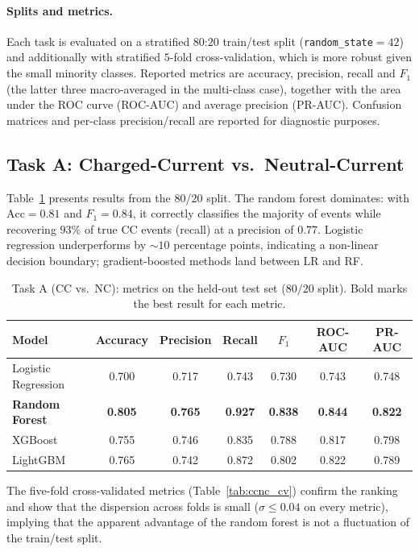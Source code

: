 \documentclass[11pt,a4paper]{article}
\begin{document}
\paragraph{Splits and metrics.}
Each task is evaluated on a stratified $80$:$20$ train/test split (\texttt{random\_state}$=42$) and additionally with stratified $5$-fold cross-validation, which is more robust given the small minority classes.  Reported metrics are accuracy, precision, recall and $F_1$ (the latter three macro-averaged in the multi-class case), together with the area under the ROC curve (ROC-AUC) and average precision (PR-AUC).  Confusion matrices and per-class precision/recall are reported for diagnostic purposes.

\subsection{Task A: Charged-Current vs.\ Neutral-Current}
\label{sec:ccnc}

Table~\ref{tab:ccnc_single} presents results from the $80$/$20$ split.  The random forest dominates: with $\text{Acc}=0.81$ and $F_1=0.84$, it correctly classifies the majority of events while recovering $93\%$ of true CC events (recall) at a precision of $0.77$.  Logistic regression underperforms by $\sim10$ percentage points, indicating a non-linear decision boundary; gradient-boosted methods land between LR and RF.

\begin{table}[ht]
\centering
\small
\begin{tabular}{lcccccc}
\toprule
Model & Accuracy & Precision & Recall & $F_1$ & ROC-AUC & PR-AUC \\
\midrule
Logistic Regression & 0.700 & 0.717 & 0.743 & 0.730 & 0.743 & 0.748 \\
\textbf{Random Forest} & \textbf{0.805} & \textbf{0.765} & \textbf{0.927} & \textbf{0.838} & \textbf{0.844} & \textbf{0.822} \\
XGBoost             & 0.755 & 0.746 & 0.835 & 0.788 & 0.817 & 0.798 \\
LightGBM            & 0.765 & 0.742 & 0.872 & 0.802 & 0.822 & 0.789 \\
\bottomrule
\end{tabular}
\caption{Task A (CC vs.\ NC): metrics on the held-out test set ($80/20$ split).  Bold marks the best result for each metric.}
\label{tab:ccnc_single}
\end{table}

The five-fold cross-validated metrics (Table~\ref{tab:ccnc_cv}) confirm the ranking and show that the dispersion across folds is small ($\sigma\le 0.04$ on every metric), implying that the apparent advantage of the random forest is not a fluctuation of the train/test split.
\end{document}
